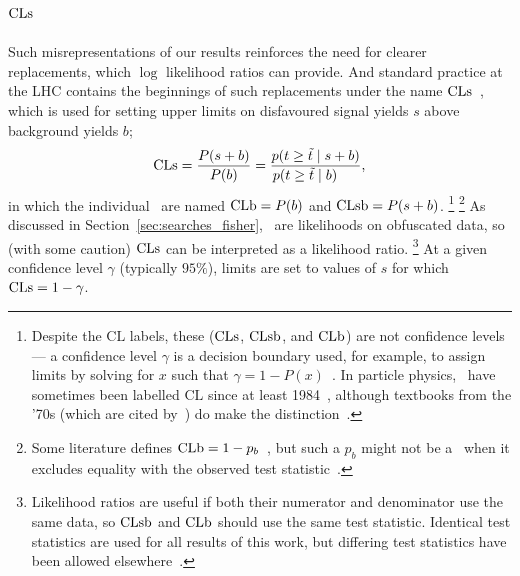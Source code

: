 \subsection{\texorpdfstring{$\mathrm{CLs}$}{CLs}}
Such misrepresentations of our results reinforces the need for clearer
replacements, which $\log$ likelihood ratios can provide.
And standard practice at the LHC contains the beginnings of such
replacements under the name $\mathrm{CLs}$~\cite{
read2000modified,
Read2002cls,
junk1999confidence,
read1997optimal,
bock1998lower,
etde1998prospects,
lep2000searches,
lep2003search,
Murray2010heretic,
cern2011procedure,
pdg2022ynf
},
which is used for setting upper limits on disfavoured signal yields $s$
above background yields $b$;
\begin{equation}
\label{eqn:searches_cls}
\mathrm{CLs}
=
\frac{P(s + b)}{P(b)}
=
\frac{
p(t \geq \tilde{t} \mid s + b)
}{
p(t \geq \tilde{t} \mid b)\hphantom{s +\;}
}
,
\end{equation}
in which the individual \pvalues\ are named
$\mathrm{CLb} = P(b)$ and
$\mathrm{CLsb} = P(s + b)$.%
\footnote{%
Despite the $\mathrm{CL}$ labels, these ($\mathrm{CLs}$, $\mathrm{CLsb}$, and $\mathrm{CLb}$) are
not confidence levels ---
a confidence level $\gamma$ is a decision boundary used, for example,
to assign limits by solving for $x$ such that
$\gamma = 1 - P(x)$~\cite{pdg1996}.
In particle physics, \pvalues\ have sometimes been labelled $\mathrm{CL}$ since
at least 1984~\cite{pdg1984}, although textbooks from the '70s (which are cited
by~\cite{pdg1984}) do make the distinction~\cite{
eadie1971statistical,
frodesen1979probability
}.%
}%
\footnote{%
Some literature defines $\mathrm{CLb} = 1 - p_b$~\cite{
Cowan:2010js,
pdg2022ynf
}, but such a $p_b$ might not be a \pvalue\ when it excludes equality with the
observed test statistic~\cite{cern2011procedure}.
}%
As discussed in Section~\ref{sec:searches_fisher}, \pvalues\ are likelihoods
on obfuscated data, so (with some caution) $\mathrm{CLs}$ can be interpreted as a
likelihood ratio.%
\footnote{%
Likelihood ratios are useful if both their numerator and denominator use the
same data, so $\mathrm{CLsb}$ and $\mathrm{CLb}$ should use the same test statistic.
Identical test statistics are used for all results of this work, but differing
test statistics have been allowed elsewhere~\cite{bock1998lower}.
}%
At a given confidence level $\gamma$ (typically $95\%$), limits are set to
values of $s$ for which $\mathrm{CLs} = 1 - \gamma$.

